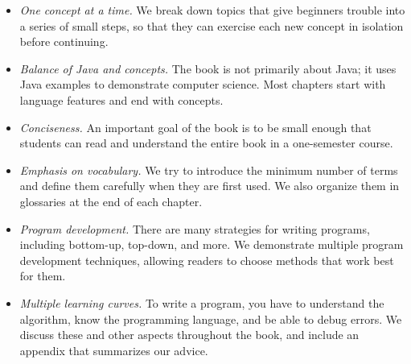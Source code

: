 \documentclass[12pt]{book}
\theoremstyle{exercise}
\newcommand{\java}[1]{\verb"#1"}
\begin{document}
\begin{itemize}

\item {\em One concept at a time.}
We break down topics that give beginners trouble into a series of small steps, so that they can exercise each new concept in isolation before continuing.

\item {\em Balance of Java and concepts.}
The book is not primarily about Java; it uses Java examples to demonstrate computer science.
Most chapters start with language features and end with concepts.

\item {\em Conciseness.}
An important goal of the book is to be small enough that students can read and understand the entire book in a one-semester course.

\item {\em Emphasis on vocabulary.}
We try to introduce the minimum number of terms and define them carefully when they are first used.
We also organize them in glossaries at the end of each chapter.

\item {\em Program development.}
There are many strategies for writing programs, including bottom-up, top-down, and more.
We demonstrate multiple program development techniques, allowing readers to choose methods that work best for them.

\item {\em Multiple learning curves.}
To write a program, you have to understand the algorithm, know the programming language, and be able to debug errors.
We discuss these and other aspects throughout the book, and include an appendix that summarizes our advice.



\end{itemize}
\end{document}
